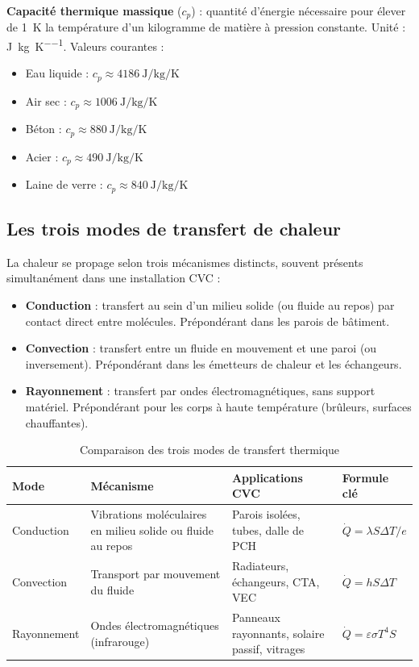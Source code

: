 \begin{definition}
  \textbf{Capacité thermique massique} (\(c_p\)) : quantité d'énergie nécessaire pour élever
  de \SI{1}{\kelvin} la température d'un kilogramme de matière à pression constante.
  Unité : \si{\joule\per\kilogram\per\kelvin}. Valeurs courantes :
  \begin{itemize}
    \item Eau liquide : \(c_p \approx \SI{4186}{\joule\per\kilogram\per\kelvin}\)
    \item Air sec : \(c_p \approx \SI{1006}{\joule\per\kilogram\per\kelvin}\)
    \item Béton : \(c_p \approx \SI{880}{\joule\per\kilogram\per\kelvin}\)
    \item Acier : \(c_p \approx \SI{490}{\joule\per\kilogram\per\kelvin}\)
    \item Laine de verre : \(c_p \approx \SI{840}{\joule\per\kilogram\per\kelvin}\)
  \end{itemize}
\end{definition}

\subsection{Les trois modes de transfert de chaleur}

La chaleur se propage selon trois mécanismes distincts, souvent présents simultanément dans
une installation CVC :

\begin{itemize}
  \item \textbf{Conduction} : transfert au sein d'un milieu solide (ou fluide au repos) par
        contact direct entre molécules. Prépondérant dans les parois de bâtiment.
  \item \textbf{Convection} : transfert entre un fluide en mouvement et une paroi (ou
        inversement). Prépondérant dans les émetteurs de chaleur et les échangeurs.
  \item \textbf{Rayonnement} : transfert par ondes électromagnétiques, sans support matériel.
        Prépondérant pour les corps à haute température (brûleurs, surfaces chauffantes).
\end{itemize}

\begin{table}[H]
  \centering
  \caption{Comparaison des trois modes de transfert thermique}
  \begin{tabular}{p{2.8cm}p{4cm}p{4.5cm}p{3cm}}
    \toprule
    Mode & Mécanisme & Applications CVC & Formule clé \\
    \midrule
    Conduction & Vibrations moléculaires en milieu solide ou fluide au repos & Parois isolées, tubes, dalle de PCH & $\dot{Q} = \lambda S \Delta T / e$ \\
    Convection & Transport par mouvement du fluide & Radiateurs, échangeurs, CTA, VEC & $\dot{Q} = h S \Delta T$ \\
    Rayonnement & Ondes électromagnétiques (infrarouge) & Panneaux rayonnants, solaire passif, vitrages & $\dot{Q} = \varepsilon \sigma T^4 S$ \\
    \bottomrule
  \end{tabular}
\end{table}

